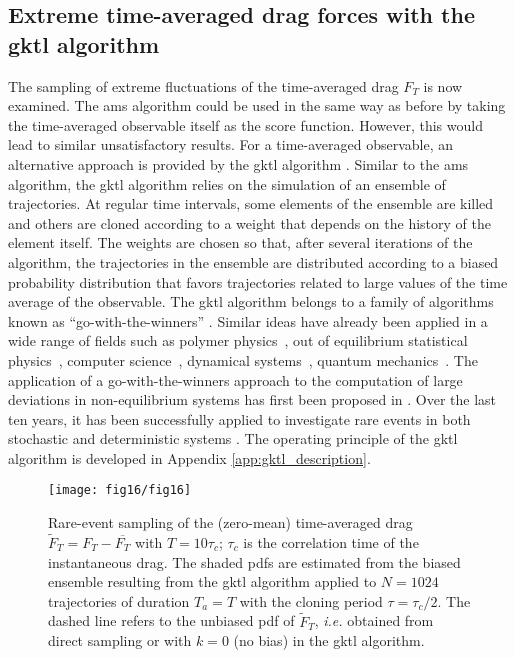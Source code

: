 \subsection{Extreme time-averaged drag forces with the \acl{gktl} algorithm}
\label{sec:gktl}
The sampling of extreme fluctuations of the time-averaged drag $F_T$ is now examined.
The \ac{ams} algorithm could be used in the same way as before by taking the time-averaged observable itself as the score function.
However, this would lead to similar unsatisfactory results.
%
For a time-averaged observable, an alternative approach is provided by the \acf{gktl} algorithm \citep{giardina_direct_2006,tailleur_probing_2007,giardina_simulating_2011}.
%
Similar to the \ac{ams} algorithm, the \ac{gktl} algorithm relies on the simulation of an ensemble of trajectories.
%
At regular time intervals, some elements of the ensemble are killed and others are cloned according to a weight that depends on the history of the element itself.
%
The weights are chosen so that, after several iterations of the algorithm, the trajectories in the ensemble are distributed according to a biased probability distribution that favors trajectories related to large values of the time average of the observable.
%
The \ac{gktl} algorithm belongs to a family of algorithms known as ``go-with-the-winners'' \citep{aldous1994go,grassberger2002go}.
{Similar ideas have already been applied in a wide range of fields such as polymer physics~\citep{grassberger1998perm}, out of equilibrium statistical physics~\citep{PhysRevLett.118.115702}, computer science~\citep{aldous1994go}, dynamical systems~\citep{tailleur_probing_2007}, quantum mechanics~\citep{intro_DMC_kosztin}.}
The application of a go-with-the-winners approach to the computation of large deviations in non-equilibrium systems has first been proposed in \citep{giardina_direct_2006}.
Over the last ten years, it has been successfully applied to investigate rare events in both stochastic \citep{giardina_direct_2006,lecomte_numerical_2007,garrahan2007dynamical} and deterministic systems \citep{giardina_direct_2006,tailleur_probing_2007}.
The operating principle of the \ac{gktl} algorithm is developed in Appendix \ref{app:gktl_description}.

\begin{figure}
	\centering
	\texttt{[image: fig16/fig16]}
	\caption{\label{fig:IS_GKTL} Rare-event sampling of the (zero-mean) time-averaged drag $\tilde F_T = F_T - \overline{F_T}$ with $T=10\tau_c$; $\tau_c$ is the correlation time of the instantaneous drag. The shaded \ac{pdf}s are estimated from the biased ensemble resulting from the \ac{gktl} algorithm applied to $N=1024$ trajectories of duration $T_a=T$ with the cloning period $\tau=\tau_c/2$.
		The dashed line refers to the unbiased \ac{pdf} of $\tilde F_T$, \textit{i.e.} obtained from direct sampling or with $k=0$ (no bias) in the \ac{gktl} algorithm.
	}
\end{figure}

